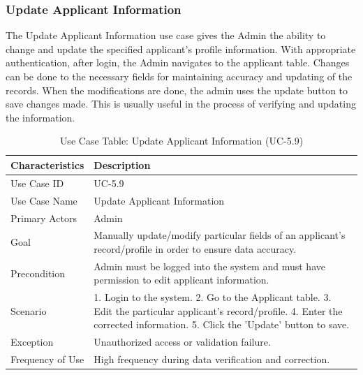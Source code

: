 \subsubsection{Update Applicant Information}
The Update Applicant Information use case gives the Admin the ability to change and update the specified applicant's profile information. With appropriate authentication, after login, the Admin navigates to the applicant table. Changes can be done to the necessary fields for maintaining accuracy and updating of the records. When the modifications are done, the admin uses the update button to save changes made. This is usually useful in the process of verifying and updating the information.
\begin{table}[H]
    \centering
    \small
    \renewcommand{\arraystretch}{1.4}
    \caption{Use Case Table: Update Applicant Information (UC-5.9)} %
    \label{tab:update-applicant-info-registrar-admin}
    \begin{tabularx}{\textwidth}{|l|X|}
        \hline
        \rowcolor[gray]{0.9} {Characteristics} & {Description} \\ \hline
        Use Case ID & UC-5.9 \\ \hline
        Use Case Name & Update Applicant Information \\ \hline
        Primary Actors & Admin \\ \hline
        Goal & Manually update/modify particular fields of an applicant's record/profile in order to ensure data accuracy. \\ \hline
        Precondition & Admin must be logged into the system and must have permission to edit applicant information. \\ \hline
        Scenario & 1. Login to the system. 2. Go to the Applicant table. 3. Edit the particular applicant's record/profile. 4. Enter the corrected information. 5. Click the 'Update' button to save. \\ \hline
        Exception & Unauthorized access or validation failure. \\ \hline
        Frequency of Use & High frequency during data verification and correction. \\ \hline
    \end{tabularx}
\end{table}
\FloatBarrier